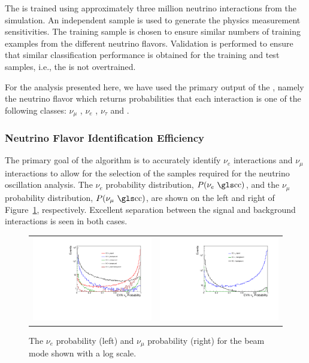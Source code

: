 The  is trained using approximately three million neutrino interactions from the  simulation. An independent sample is used to generate the physics measurement sensitivities. The training sample is chosen to ensure similar numbers of training examples from the different neutrino flavors. Validation is performed to ensure that similar classification performance is obtained for the training and test samples, i.e., the  is not overtrained.



For the analysis presented here, we have used the primary output of the , namely the neutrino flavor which returns probabilities that each interaction is one of the following classes: $\nu_{\mu}$ , $\nu_{e}$ , $\nu_{\tau}$  and . 


\subsubsection{Neutrino Flavor Identification Efficiency}
The primary goal of the  algorithm is to accurately identify $\nu_{e}$  interactions and $\nu_{\mu}$  interactions to allow for the selection of the samples required for the neutrino oscillation analysis. The $\nu_{e}$  probability distribution, $P(\nu_e \textrm{ \dword{cc}})$, and the $\nu_\mu$  probability distribution, $P(\nu_\mu \textrm{ \dword{cc}})$, are shown on the left and right of Figure~\ref{fig:cvnprob}, respectively. Excellent separation between the signal and background interactions is seen in both cases.

\begin{figure}
    \centering
    \begin{tabular}{cc}
		\includegraphics[width=0.45\linewidth]{graphics/cvn_nue_prob_log.pdf} &
		\includegraphics[width=0.45\linewidth]{graphics/cvn_numu_prob_log.pdf} 
	\end{tabular}
	\caption[The CVN \nue CC probability and \numu CC probability for the FHC beam mode]{The  $\nu_e$  probability (left) and $\nu_\mu$  probability (right) for the  beam mode shown with a log scale.}
    \label{fig:cvnprob}
\end{figure}

